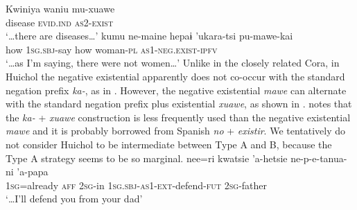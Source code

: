 \documentclass[output=paper]{langsci/langscibook}
\begin{document}
\ea
\label{ex:odam-huichdisea}
\gll Kwiniya	waniu 		mu-xuawe\\
disease	\textsc{evid.ind} 	\textsc{as2-exist}\\
\glt ‘…there are diseases…’ \citep[112]{bierge2017}
\z 
\ea
\label{ex:odam-huichyb}
\gll kumu ne-maine hepaɨ ’ukara-tsi pu-mawe-kai\\
how \textsc{1sg.sbj}-say how woman-\textsc{pl} \textsc{as1-neg.exist-ipfv}\\
\glt ‘…as I’m saying, there were not women…’ \citep[112]{bierge2017}
\z 
Unlike in the closely related Cora, in Huichol the negative existential apparently does not co-occur with the standard negation prefix \emph{ka-}, as in . However, the negative existential \emph{mawe} can alternate with the standard negation prefix plus existential \emph{xuawe}, as shown in . \citet[115]{bierge2017} notes that the \emph{ka-} + \emph{xuawe} construction is less frequently used than the negative existential \emph{mawe} and it is probably borrowed from Spanish \emph{no} + \emph{existir}. We tentatively do not consider Huichol to be intermediate between Type A and B, because the Type A strategy seems to be so marginal.
\ea
\label{ex:odam-huichnew}
\gll nee=ri kwatsie ’a-hetsie ne-p-e-tanua-ni ’a-papa\\
 \textsc{1sg}=already \textsc{aff} \textsc{2sg}-in \textsc{1sg.sbj-as1-ext}-defend-\textsc{fut} \textsc{2sg}-father\\
\glt ‘…I’ll defend you from your dad’
\end{document}
